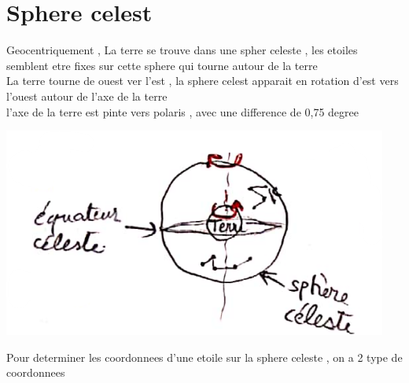 \documentclass[12pt]{book}
\begin{document}
    \chapter{Sphere celest}
        \begin{minipage}{0.65\linewidth}
            Geocentriquement , La terre se trouve dans une spher celeste , les etoiles semblent etre fixes sur cette sphere qui tourne autour de la terre \\ 
            La terre tourne de ouest ver l'est , la sphere celest apparait en rotation d'est vers l'ouest autour de l'axe de la terre \\
            l'axe de la terre est pinte vers polaris , avec une difference de 0,75 degree
        \end{minipage}
        \begin{minipage}{0.34\linewidth}
            \includegraphics[width=\linewidth]{pic/spherecelest.png}
        \end{minipage}
        Pour determiner les coordonnees d'une etoile sur la sphere celeste , on a 2 type de coordonnees 
\end{document}
